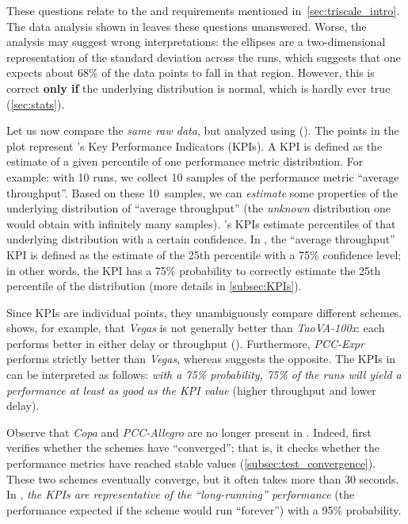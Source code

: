 These questions relate to the  and  requirements mentioned in~\cref{sec:triscale_intro}.
The data analysis shown in  leaves these questions unanswered.
Worse, the analysis may suggest wrong interpretations: the ellipses are a two-dimensional representation of the standard deviation across the runs, which suggests that one expects about 68\% of the data points to fall in that region.
However, this is correct \textbf{only if} the underlying distribution is normal, which is hardly ever true (\cref{sec:stats}).

Let us now compare the \emph{same raw data}, but analyzed using \triscale ().
The points in the plot represent \triscale's Key Performance Indicators (KPIs).
A KPI is defined as the estimate of a given percentile of one performance metric distribution.
For example: with 10 runs, we collect 10 samples of the performance metric ``average throughput''.
Based on these 10~samples, we can \emph{estimate} some properties of the underlying distribution of ``average throughput'' (\ie the \emph{unknown} distribution one would obtain with infinitely many samples).
\triscale's KPIs estimate percentiles of that underlying distribution with a certain confidence.
In , the ``average throughput'' KPI is defined as the estimate of the 25th percentile with a 75\% confidence level; in other words, the KPI has a 75\% probability to correctly estimate the 25th percentile of the distribution (more details in \cref{subsec:KPIs}).

Since KPIs are individual points, they unambiguously compare different schemes.
\triscale shows, for example, that \textit{Vegas} is not generally better than \textit{TaoVA-100x}: each performs better in either delay or throughput ().
Furthermore, \textit{PCC-Expr} performs strictly better than \textit{Vegas}, whereas  suggests the opposite.
The KPIs in  can be interpreted as follows:\emph{
with a 75\% probability, 75\% of the runs will yield a performance at least as good as the KPI value} (\ie higher throughput and lower delay).

Observe that \textit{Copa} and \textit{PCC-Allegro} are no longer present in .
Indeed, \triscale first verifies whether the schemes have ``converged''; that is, it checks whether the performance metrics have reached stable values (\cref{subsec:test_convergence}).
These two schemes eventually converge, but it often takes more than 30 seconds.
In ,
\emph{the KPIs are representative of the ``long-running'' performance} (\ie the performance expected if the scheme would run ``forever'') with a 95\% probability.

